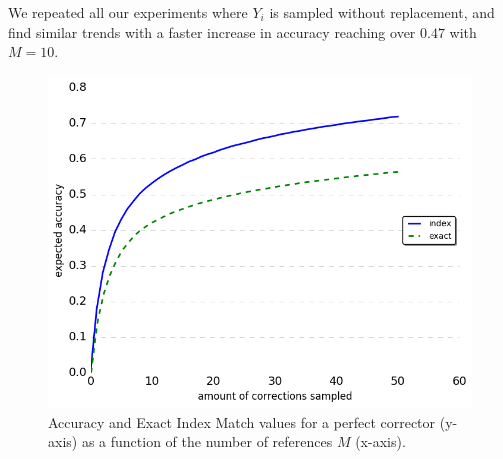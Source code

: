 \documentclass[letterpaper, 11pt]{article}
\begin{document}
We repeated all our experiments where $Y_i$ is sampled without replacement,
and find similar trends with a faster increase in accuracy reaching over $0.47$ with $M=10$.

%
%
%
%

\begin{figure}
	\vspace{-1em}
  \includegraphics[width=0.9\columnwidth]{noSig_repeat_1000_accuracy}
  \caption{Accuracy and Exact Index Match values for a perfect corrector (y-axis)
    as a function of the number of references $M$ (x-axis).
  } \label{fig:accuracy_vals}
  \vspace{-0.5cm}
\end{figure}
\end{document}
